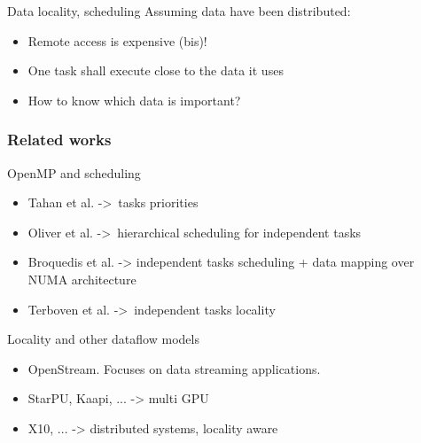 \documentclass[xcolor={usenames,dvipsnames,svgnames,table}, aspectratio=43]{beamer}
\begin{document}
\begin{frame}[fragile]
{{}
}
 {
\begin{block}{Data locality, scheduling}
  Assuming data have been distributed:
    \begin{itemize}
      \item Remote access is expensive (bis)!
      \item One task shall execute close to the data it uses
      \item How to know which data is important?
    \end{itemize}
\end{block}

}

\end{frame}


\begin{frame}
\frametitle{Related works}
\begin{block}{OpenMP and scheduling}
    \begin{itemize}
      \item Tahan et al. -> tasks priorities
      \item Oliver et al. -> hierarchical scheduling for independent tasks
      \item Broquedis et al. -> independent tasks scheduling + data mapping over NUMA architecture
      \item Terboven et al. -> independent tasks locality
    \end{itemize}
\end{block}
\begin{block}{Locality and other dataflow models}
    \begin{itemize}
      \item OpenStream. Focuses on data streaming applications.
      \item StarPU, Kaapi, ... -> multi GPU
      \item X10, ... -> distributed systems, locality aware
    \end{itemize}
\end{block}
\end{frame}
\end{document}
